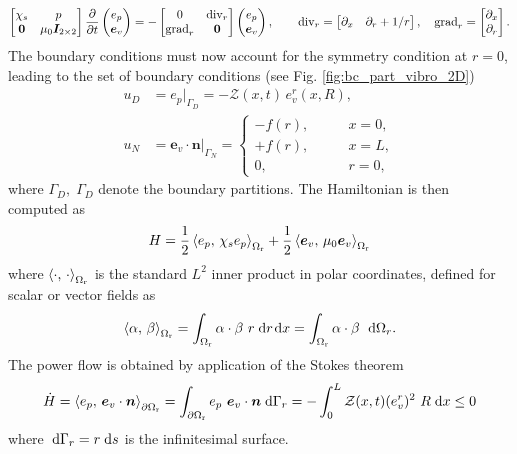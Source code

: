 \begin{equation}
\label{eq:red_mod}
\begin{bmatrix}
\chi_s & p \\
\bm{0} & \mu_0 \bm{I}_{2\times 2} \\
\end{bmatrix}
\diffp{}{t}
\begin{pmatrix}
e_p \\
\bm{e}_v \\
\end{pmatrix} = -
\begin{bmatrix}
0 & \div_r \\
{\grad}_r & \bm{0} \\
\end{bmatrix}
\begin{pmatrix}
e_p \\
\bm{e}_v \\
\end{pmatrix}, \qquad
{\div}_r = \begin{bmatrix}
\partial_x & \partial_r + 1/r
\end{bmatrix}, \quad
{\grad}_r = \begin{bmatrix}
\partial_x\\
\partial_r\\
\end{bmatrix}.
\end{equation}
The boundary conditions must now account for the symmetry condition at $r=0$, leading to the set of boundary conditions (see Fig. \ref{fig:bc_part_vibro_2D})
\begin{align}
u_D &=  e_p|_{\Gamma_D} = - \mathcal{Z}(x, t) \, e_v^r(x, R), \label{eq:bc_imp} \\
u_N &= \bm{e}_v \cdot \bm{n}|_{\Gamma_N} = 
\begin{cases}
- f(r), \qquad &x=0, \\
+ f(r), \qquad &x=L, \\
0, \qquad &r=0,
\end{cases} \label{eq:bc_neu}
\end{align}
where $\Gamma_D, \; \Gamma_D$ denote the boundary partitions.
 The Hamiltonian is then computed as
\[
H = \frac{1}{2} \inner[\Omega_{\text{r}}]{e_p}{\chi_s e_p} + \frac{1}{2} \inner[\Omega_{\text{r}}]{\bm{e}_v}{\mu_0 \bm{e}_v}
\]
where $\inner[\Omega_{\text{r}}]{\cdot}{\cdot}$ is the standard $L^2$ inner product in polar coordinates, defined for scalar or vector fields as
\[
\inner[\Omega_{\text{r}}]{\alpha}{\beta}= \int_{\Omega_{\text{r}}} \alpha \cdot \beta \ r \d{r} \d{x} = \int_{\Omega_{\text{r}}} \alpha \cdot \beta \ \d{\Omega_r}.
\]
The power flow is obtained by application of the Stokes theorem
\[
\dot{H} = \inner[\partial \Omega_{\text{r}}]{e_p}{\bm{e}_v \cdot \bm{n}} = \int_{\partial \Omega_{\text{r}}} e_p \ \bm{e}_v \cdot \bm{n} \d{\Gamma_r} = - \int_{0}^{L} \mathcal{Z}(x, t) (e_v^r)^2 \ R \d{x} \le 0 
\]
where $\d{\Gamma_r} = r \d{s}$ is the infinitesimal surface. \\

